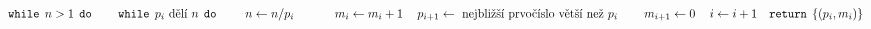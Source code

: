 \documentclass[preview]{standalone}
\begin{document}
\begin{align*}
&\mathtt{ while } \:\: n > 1 \:\: \mathtt{ do } &\hspace*{12pt}\mathtt{ while } \:\: p_i \text{ dělí } n \:\: \mathtt{ do } &\hspace*{24pt}n \leftarrow n / p_i &\hspace*{24pt}m_i \leftarrow m_i + 1 &\hspace*{12pt}p_{i+1} \leftarrow \text{ nejbližší prvočíslo větší než } p_i &\hspace*{12pt}m_{i+1} \leftarrow 0 &\hspace*{12pt}i \leftarrow i + 1 &\mathtt{ return } \:\: \{(p_i, m_i)\}
\end{align*}
\end{document}
